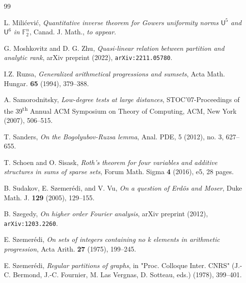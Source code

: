 \documentclass[a4paper,11pt]{article}
\numberwithin{theorem}{section}
\theoremstyle{definition}
\newcommand{\tss}[1]{\textsuperscript{#1}}
\renewenvironment{thebibliography}[1]
{
  \begin{oldthebibliography}{#1}
    \setlength{\itemsep}{0em  plus 0.3ex}
    \setlength{\parskip}{0em}
}
{
  \end{oldthebibliography}
}
\begin{document}
\begin{thebibliography}{99}

 L. Mili\'cevi\'c, \emph{Quantitative inverse theorem for Gowers uniformity norms $\mathsf{U}^5$ and $\mathsf{U}^6$ in $\mathbb{F}_2^n$}, Canad. J. Math., \emph{to appear}.


 G. Moshkovitz and D. G. Zhu, \textit{Quasi-linear relation between partition and analytic rank}, arXiv preprint (2022), \verb+arXiv:2211.05780+.

 I.Z. Ruzsa, \textit{Generalized arithmetical progressions and sumsets}, Acta Math. Hungar. \textbf{65} (1994), 379--388.

 A. Samorodnitsky, \textit{Low-degree tests at large distances}, STOC'07-Proceedings of the 39\tss{th} Annual ACM Symposium on Theory of Computing, ACM, New York (2007), 506--515.

 T. Sanders, \textit{On the Bogolyubov-Ruzsa lemma}, Anal. PDE, 5 (2012), no. 3, 627--655.

 T. Schoen and O. Sisask, \textit{Roth’s theorem for four variables and additive structures in sums of sparse sets}, Forum Math. Sigma \textbf{4} (2016), e5, 28 pages.

 B. Sudakov, E. Szemer\'edi, and V. Vu, \textit{On a question of Erd\"os and Moser}, Duke Math. J. \textbf{129} (2005), 129--155.

 B. Szegedy, \textit{On higher order Fourier analysis}, arXiv preprint (2012), \verb+arXiv:1203.2260+.

 E. Szemer\'edi, \textit{On sets of integers containing no k elements in arithmetic progression}, Acta Arith. \textbf{27} (1975), 199--245.

 E. Szemer\'edi, \textit{Regular partitions of graphs}, in "Proc. Colloque Inter. CNRS" (J.-C. Bermond, J.-C. Fournier, M. Las Vergnas, D. Sotteau, eds.) (1978), 399--401.




\end{thebibliography}
\end{document}
